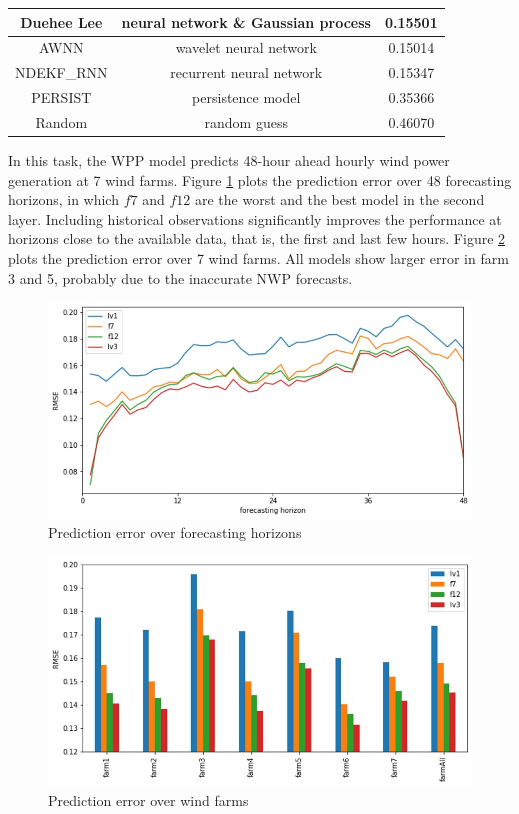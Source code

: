 \documentclass[conference]{IEEEtran}
\begin{document}
\begin{table}
\begin{center}
{\begin{tabular}{|c|c|c|}
Duehee Lee \cite{HONG2014357}         & neural network \& Gaussian process & 0.15501  \\ \hline
AWNN \cite{7894735}     & wavelet neural network    & 0.15014           \\ \hline
NDEKF\_RNN \cite{Kanna13} & recurrent neural network  & 0.15347           \\ \hline
PERSIST                 & persistence model         & 0.35366           \\ \hline
Random                  & random guess              & 0.46070           \\ \hline
\end{tabular}
}
\label{tab:RMSE}
\end{center}
\vspace*{-5mm}
\end{table}

In this task, the WPP model predicts 48-hour ahead hourly wind power generation at 7 wind farms. Figure \ref{fig:horizon} plots the prediction error over 48 forecasting horizons, in which $f7$ and $f12$ are the worst and the best model in the second layer. Including historical observations significantly improves the performance at horizons close to the available data, that is, the first and last few hours. Figure \ref{fig:error_farm} plots the prediction error over 7 wind farms. All models show larger error in farm 3 and 5, probably due to the inaccurate NWP forecasts. 

\begin{figure}[b]
\vspace*{-1mm}
\centering
\includegraphics[width=0.9\columnwidth]{FIG/horizon}
\caption{Prediction error over forecasting horizons}
\label{fig:horizon}
\end{figure}

\begin{figure}
\centering
\includegraphics[width=0.8\columnwidth]{FIG/error_farm}
\caption{Prediction error over wind farms}
\label{fig:error_farm}
\end{figure}
\end{document}
